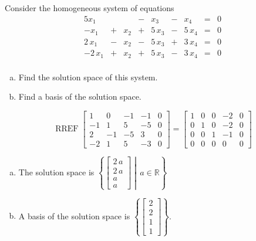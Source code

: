 
\begin{exerciseStatement}


Consider the homogeneous system of equations 
\begin{alignat*}{5} x_{1} & &  &-& x_{3} &-& x_{4} &=& 0 \\-x_{1} &+& x_{2} &+& 5 \, x_{3} &-& 5 \, x_{4} &=& 0 \\2 \, x_{1} &-& x_{2} &-& 5 \, x_{3} &+& 3 \, x_{4} &=& 0 \\-2 \, x_{1} &+& x_{2} &+& 5 \, x_{3} &-& 3 \, x_{4} &=& 0 \\ \end{alignat*}
            


\begin{enumerate}[(a)]
\item  Find the solution space of this system.
\item  Find a basis of the solution space.
\end{enumerate}
    
\end{exerciseStatement}
    
\begin{exerciseAnswer} 


\[\operatorname{RREF} \left[\begin{array}{cccc|c}
1 & 0 & -1 & -1 & 0 \\
-1 & 1 & 5 & -5 & 0 \\
2 & -1 & -5 & 3 & 0 \\
-2 & 1 & 5 & -3 & 0
\end{array}\right] = \left[\begin{array}{cccc|c}
1 & 0 & 0 & -2 & 0 \\
0 & 1 & 0 & -2 & 0 \\
0 & 0 & 1 & -1 & 0 \\
0 & 0 & 0 & 0 & 0
\end{array}\right] \]


\begin{enumerate}[(a)]
\item The solution space is \( \left\{ \left[\begin{array}{c}
2 \, a \\
2 \, a \\
a \\
a
\end{array}\right] \middle|\,a\in\mathbb{R}\right\} \)
\item A basis of the solution space is \( \left\{ \left[\begin{array}{c}
2 \\
2 \\
1 \\
1
\end{array}\right] \right\} \).
\end{enumerate}
    
\end{exerciseAnswer}
    
